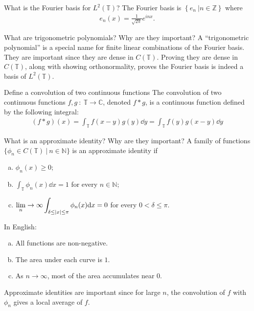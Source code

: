 \documentclass[avery5388,grid,frame]{flashcards}
\def\Cx{\mathbb{C}}
\def\torus{\mathbb{T}}
\begin{document}


\begin{flashcard}
    {What is the Fourier basis for $L^2(\torus)$?}
    The Fourier basis is $\left\{e_n\ | n \in \mathbb{Z}\right\}$ where
    \begin{align*}
        e_n(x) = \frac{1}{\sqrt{2\pi}}e^{inx}.
    \end{align*}
\end{flashcard}

\begin{flashcard}
    {What are trigonometric polynomials?  Why are they important?}
    A ``trigonometric polynomial'' is a special name for finite linear combinations of the Fourier basis.  They are important since they are dense in $C(\torus)$.  Proving they are dense in $C(\torus)$, along with showing orthonormality, proves the Fourier basis is indeed a basis of $L^2(\torus)$.
\end{flashcard}

\begin{flashcard}
    {Define a convolution of two continuous functions}
    The convolution of two continuous functions $f,g\ :\ \torus \rightarrow \Cx$, denoted $f * g$, is a continuous function defined by the following integral:
    \begin{align*}
        (f*g)(x) = \int_\torus f(x-y)g(y)\dd y = \int_\torus f(y)g(x-y)\dd y
    \end{align*}
\end{flashcard}

\begin{flashcard}
    {What is an approximate identity?  Why are they important?}
    A family of functions $\{\phi_n \in C(\torus)\ |\ n \in \mathbb{N}\}$ is an approximate identity if
    \begin{enumerate}[(a)]
        \setlength{\itemsep}{0pt}
        \item $\displaystyle\phi_n(x) \geq 0$;
        \item $\displaystyle\int_\torus \phi_n(x)\dd x = 1$ for every $n \in \mathbb{N}$;
        \item $\displaystyle\lim_n\rightarrow \infty \int_{\delta\leq\abs{x}\leq \pi} \phi_n(x) \dd x = 0$ for every $0 < \delta \leq \pi$.
    \end{enumerate}
    In English:
    \begin{enumerate}[(a)]
        \setlength{\itemsep}{0pt}
        \item All functions are non-negative.
        \item The area under each curve is $1$.
        \item As $n \rightarrow \infty$, most of the area accumulates near $0$.
    \end{enumerate}
    Approximate identities are important since for large $n$, the convolution of $f$ with $\phi_n$ gives a local average of $f$.
\end{flashcard}
\end{document}
